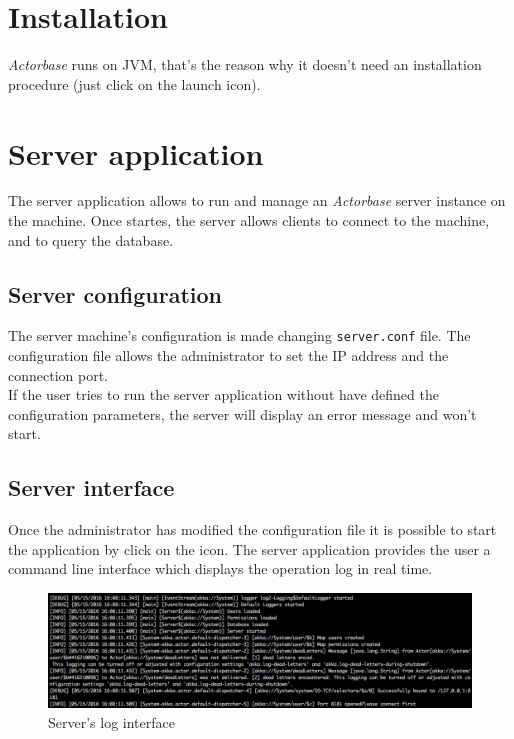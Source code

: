 \documentclass[a4paper]{article}
\begin{document}
	\section{Installation}
	\emph{Actorbase} runs on JVM, that's the reason why it doesn't need an installation procedure (just click on the launch icon). 
	\newpage



	\section{Server application}
	The server application allows to run and manage an \emph{Actorbase} server instance on the machine. Once startes, the server allows clients to connect to the machine, and to query the database.
	
	\subsection{Server configuration}
	The server machine's configuration is made changing \texttt{server.conf} file. The configuration file allows the administrator to set the IP address and the connection port.
	\\
	If the user tries to run the server application without have defined the configuration parameters, the server will display an error message and won't start.
	
	\subsection{Server interface}
	Once the administrator has modified the configuration file it is possible to start the application by click on the icon. The server application provides the user a command line interface which displays the operation log in real time.
	\begin{figure}[H]
		\centering
		\includegraphics[width=\textwidth]{logServer.png}
		\caption{Server's log interface}
	\end{figure}
	\newpage
	
\end{document}
